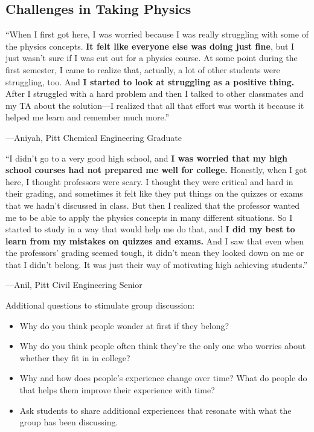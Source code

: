 \documentclass[]{article}
\begin{document}
\begin{PresentSpace}
\section*{Challenges in Taking Physics}
``When I first got here, I was worried because I was really
struggling with some of the physics concepts. \textbf{It felt like
everyone else was doing just fine}, but I just wasn’t sure
if I was cut out for a physics course. At some point during
the first semester, I came to realize that, actually, a lot of
other students were struggling, too. And \textbf{I started to look
at struggling as a positive thing.} After I struggled with a
hard problem and then I talked to other classmates and
my TA about the solution—I realized that all that effort was
worth it because it helped me learn and remember much
more.''
\begin{flushright}
---Aniyah, Pitt Chemical Engineering Graduate
\end{flushright}
``I didn’t go to a very good high school, and \textbf{I was worried that
my high school courses had not prepared me well for
college.} Honestly, when I got here, I thought professors were
scary. I thought they were critical and hard in their grading, and
sometimes it felt like they put things on the quizzes or exams
that we hadn't discussed in class. But then I realized that the
professor wanted me to be able to apply the physics concepts
in many different situations. So I started to study in a way that
would help me do that, and \textbf{I did my best to learn from my
mistakes on quizzes and exams.} And I saw that even when
the professors' grading seemed tough, it didn’t mean they
looked down on me or that I didn’t belong. It was just their way
of motivating high achieving students.''
\begin{flushright}
---Anil, Pitt Civil Engineering Senior
\end{flushright}
\end{PresentSpace}
\newpage
\begin{TeacherMargin}
Additional questions to stimulate group discussion:
\begin{itemize}
	\item Why do you think people wonder at first if they belong?
	\item Why do you think people often think they're the only one who worries about whether they fit in in college?
	\item Why and how does people's experience change over time? What do people do that helps them improve their experience with time?
	\item Ask students to share additional experiences that resonate with what the group has been discussing.
\end{itemize}
\end{TeacherMargin}
\end{document}
